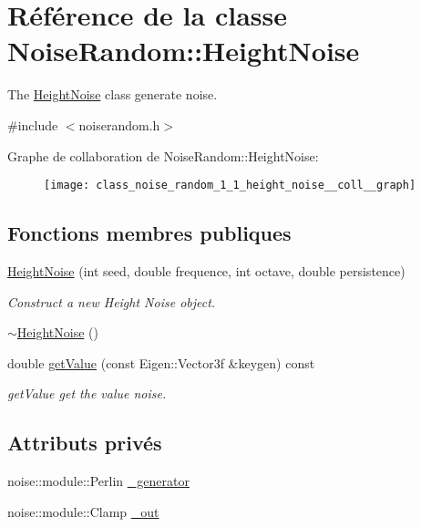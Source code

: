 \hypertarget{class_noise_random_1_1_height_noise}{}\section{Référence de la classe Noise\+Random\+:\+:Height\+Noise}
\label{class_noise_random_1_1_height_noise}


The \hyperlink{class_noise_random_1_1_height_noise}{Height\+Noise} class generate noise.  




{\ttfamily \#include $<$noiserandom.\+h$>$}



Graphe de collaboration de Noise\+Random\+:\+:Height\+Noise\+:
\nopagebreak
\begin{figure}[H]
\begin{center}
\leavevmode
\texttt{[image: class\_noise\_random\_1\_1\_height\_noise\_\_coll\_\_graph]}
\end{center}
\end{figure}
\subsection*{Fonctions membres publiques}
\begin{DoxyCompactItemize}
\item 
\hyperlink{class_noise_random_1_1_height_noise_ab166c1a0af9e801a289d33a6d7bd2292}{Height\+Noise} (int seed, double frequence, int octave, double persistence)
\begin{DoxyCompactList}\small\item\em Construct a new Height Noise object. \end{DoxyCompactList}\item 
\hyperlink{class_noise_random_1_1_height_noise_a85d91613d7cc310e928f136680afff22}{$\sim$\+Height\+Noise} ()
\item 
double \hyperlink{class_noise_random_1_1_height_noise_a2fd30f88b20ba463d156c210ef08d54e}{get\+Value} (const Eigen\+::\+Vector3f \&keygen) const
\begin{DoxyCompactList}\small\item\em get\+Value get the value noise. \end{DoxyCompactList}\end{DoxyCompactItemize}
\subsection*{Attributs privés}
\begin{DoxyCompactItemize}
\item 
noise\+::module\+::\+Perlin \hyperlink{class_noise_random_1_1_height_noise_a537d769e59cef8e6691238c9f838510f}{\+\_\+generator}
\item 
noise\+::module\+::\+Clamp \hyperlink{class_noise_random_1_1_height_noise_a5e4713b2a4522778d1478cdf75339658}{\+\_\+out}
\end{DoxyCompactItemize}


